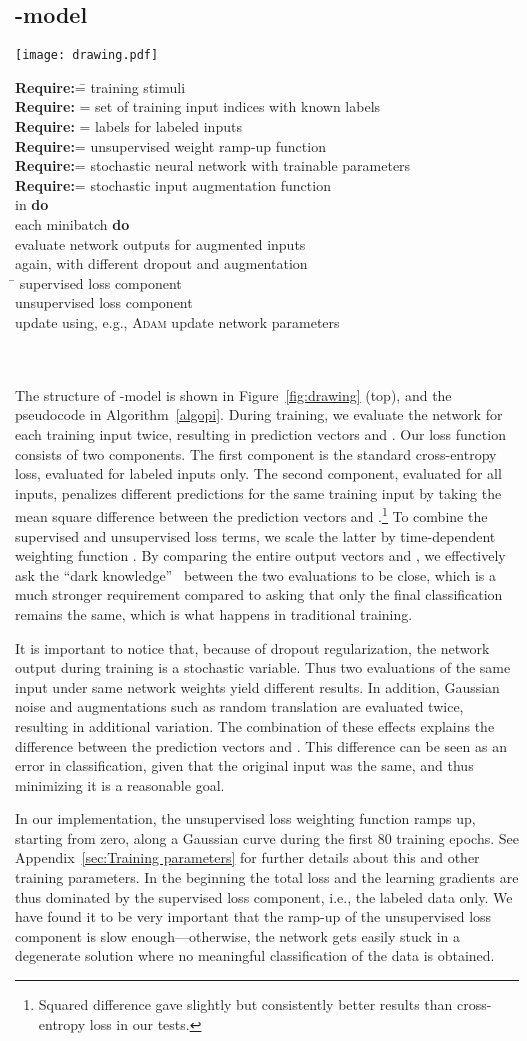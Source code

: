\documentclass{article}
\newcommand{\Req}{\textbf{Require:}\hspace*{0.5em}}
\newcommand{\X}{\hspace*{3mm}}
\newcommand{\XX}{\X\X}
\newcommand{\XXX}{\X\X\X}
\newcommand{\cm}[1]{ #1}
\newcommand{\figalgopi}{
\begin{algorithm}[t]
\caption{\label{algopi}\ 
-model pseudocode.
}
\begin{tabbing}
\Req          \= = training stimuli \hspace*{25mm} \= \\
\Req            \> = set of training input indices with known labels \\
\Req          \> = labels for labeled inputs  \\
\Req            = unsupervised weight ramp-up function \\
\Req     = stochastic neural network with trainable parameters  \\
\Req            = stochastic input augmentation function \\
\X {\bf for}  in  {\bf do} \\
\XX {\bf for} each minibatch  {\bf do} \\
\XXX                               \>\> \cm{evaluate network outputs for augmented inputs} \\
\XXX                       \>\> \cm{again, with different dropout and augmentation} \\
\XXX \=  \>   \cm{supervised loss component} \\
\XXX \>             \>   \cm{unsupervised loss component} \\
\XXX update  using, e.g., \textsc{Adam}                                \>\> \cm{update network parameters} \\
\XX {\bf end for} \\
\X {\bf end for}\\
\X {\bf return} 
\end{tabbing}
\vspace*{-1.5mm}
\end{algorithm}
}
\newcommand{\figdrawing}{
\begin{figure*}[t]
\centering
\texttt{[image: drawing.pdf]}
\caption{\label{fig:drawing}Structure of the training pass in our methods. Top: -model. Bottom: temporal ensembling.
Labels  are available only for the labeled inputs, and the associated cross-entropy loss
component is evaluated only for those.
}
\end{figure*}
}
\begin{document}
\subsection{-model}
\label{sec:pinet}

\figdrawing
\figalgopi

The structure of -model is shown in Figure~\ref{fig:drawing} (top), and the pseudocode in Algorithm~\ref{algopi}.
During training, we evaluate
the network for each training input  twice, resulting in prediction vectors  and .
Our loss function consists of two components. The first component is the standard cross-entropy loss, evaluated for
labeled inputs only. The second component, evaluated for all inputs, penalizes different predictions for the
same training input  by taking the mean square difference between the prediction vectors
 and .\footnote{Squared difference gave slightly but consistently better results than cross-entropy loss in our tests.} To combine the supervised and unsupervised loss terms, we scale the latter
by time-dependent weighting function .
By comparing the entire output vectors  and , we effectively ask the 
``dark knowledge''~\citep{Hinton15} between the two evaluations to be close, which is a much stronger requirement
compared to asking that only the final classification remains the same, which is what happens in traditional training.

It is important to notice that, because of dropout regularization, the network output during training is a 
stochastic variable. Thus two evaluations of the same input  under same network weights
 yield different results. In addition, Gaussian noise and augmentations such as random translation
are evaluated twice, resulting in additional variation. The combination of these
effects explains the difference between the prediction vectors  and . This difference
can be seen as an error in classification, given that the original input  was the same, and thus
minimizing it is a reasonable goal.

In our implementation, the unsupervised loss weighting function  ramps up, starting from zero,
along a Gaussian curve during the first 80 training epochs. 
See Appendix~\ref{sec:Training parameters} for further details about this and other training parameters.
In the beginning the total loss and the learning gradients are thus
dominated by the supervised loss component, i.e., the labeled data only. We have found it to be
very important that the ramp-up of the unsupervised loss component is slow enough---otherwise, the network 
gets easily stuck in a degenerate solution where no meaningful classification of the data is obtained. 
\end{document}
